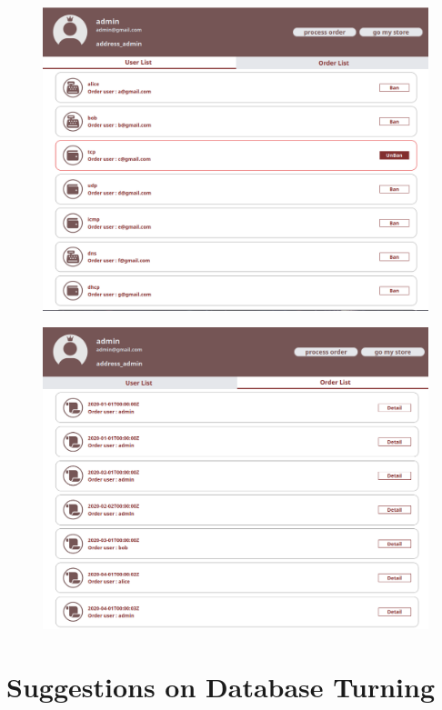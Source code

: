 \documentclass[a4paper, 12pt]{article}
\begin{document}
\begin{figure}[hp]
    \centerline{\includegraphics[width=40em]{gui-snapshot/admin/user.png}}
    \label{fig:enter-label}
\end{figure}
\newpage
{}
\begin{figure}[hp]
    \centerline{\includegraphics[width=40em]{gui-snapshot/admin/order.png}}
    \label{fig:enter-label}
\end{figure}

\newpage


\section{Suggestions on Database Turning}
\end{document}
